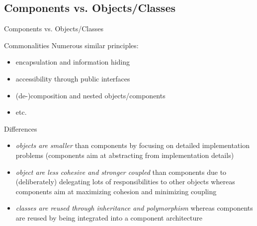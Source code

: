 \subsection{Components vs. Objects/Classes}
\begin{frame}{Components vs. Objects/Classes} %
	\begin{mycolumns}[widths={33},animation=none]
		\begin{note}{Commonalities}	
			Numerous similar principles:
			\begin{itemize}
				\item encapsulation and information hiding
				\item accessibility through public interfaces
				\item (de-)composition and nested objects/components
				\item etc.
			\end{itemize}
		\end{note}
		\pause
	\mynextcolumn
		\begin{note}{Differences}
			\begin{itemize}
				\item \emph{objects are smaller} than components by focusing on detailed implementation problems (components aim at abstracting from implementation details)
				\item \emph{object are less cohesive and stronger coupled} than components due to (deliberately) delegating lots of responsibilities to other objects whereas components aim at maximizing cohesion and minimizing coupling
				\item \emph{classes are reused through inheritance and polymorphism} whereas components are reused by being integrated into a component architecture
			\end{itemize}			
		\end{note}
	\end{mycolumns}	
\end{frame}

